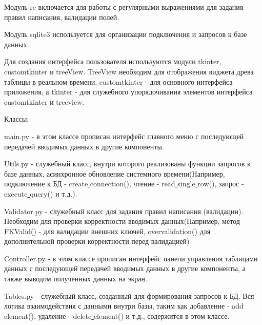 Модуль re включается для работы с регулярными выражениями для задания правил написания, валидации полей.

Модуль sqlite3 используется для организации подключения и запросов к базе данных.

Для создания интерфейса пользователя используются модули tkinter, customtkinter и treeView. TreeView необходим для отображения виджета древа таблицы в реальном времени,  customtkinter - для основного интерфейса приложения, а tkinter - для служебного упорядочивания элементов интерфейса customtkinter и treeview.

Классы:

main.py - в этом классе прописан интерфейс главного меню с последующей передачей вводимых данных в другие компоненты.

Utils.py - служебный класс, внутри которого реализованы функции запросов к базе данных, асинхронное обновление системного времени(Например, подключение к БД - create\underline{ }connection(), чтение - read\underline{ }single\underline{ }row(), запрос - execute\underline{ }query() и т.д.).

Validator.py - служебный класс для задания правил написания (валидации). Необходим для проверки корректности вводимых данных(Например, метод FKValid() - для валидации внешних ключей, overvalidation() для дополнительной проверки корректности перед валидацией)

Controller.py - в этом классе прописан интерфейс панели управления таблицами данных с последующей передачей вводимых данных в другие компоненты, а также выводом полученных данных на экран.

Tables.py - служебный класс, созданный для формирования запросов к БД. Вся логика взаимодействия с данными внутри базы, таким как добавление - add\underline{ }element(), удаление - delete\underline{ }element() и т.д., содержится в этом классе.